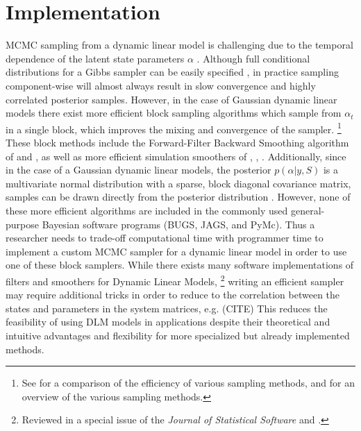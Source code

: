 \documentclass{article}
\begin{document}
\section{Implementation}
\label{sec:implementation}

MCMC sampling from a dynamic linear model is challenging due to the temporal dependence of the latent state parameters $\alpha$ \parencite{ReisSalazarGamerman2006}.
Although full conditional distributions for a Gibbs sampler can be easily specified \parencite{CarlinGelfandSmith1992}, in practice sampling component-wise will almost always result in slow convergence and highly correlated posterior samples.
However, in the case of Gaussian dynamic linear models there exist more efficient block sampling algorithms which sample from $\alpha_{t}$ in a single block, which improves the mixing and convergence of the sampler.%
\footnote{See \textcite{ReisSalazarGamerman2006} for a comparison of the efficiency of various sampling methods, and \textcite{migon2005dynamic} for an overview of the various sampling methods.}
These block methods include the Forward-Filter Backward Smoothing algorithm of \textcite{CarterKohn1994} and \textcite{Fruehwirth-Schnatter1994}, as well as more efficient simulation smoothers of \textcite{DeJongShephard1995}, \textcite{DurbinKoopman2002}, \textcite{StricklandTurnerDenhamEtAl2009}.%
Additionally, since in the case of a Gaussian dynamic linear models, the posterior $p(\alpha | y, S)$ is a multivariate normal distribution with a sparse, block diagonal covariance matrix, samples can be drawn directly from the posterior distribution \parencites{migon2005dynamic}{ChanJeliazkov2009}.
However, none of these more efficient algorithms are included in the commonly used general-purpose Bayesian software programs (BUGS, JAGS, and PyMc).
Thus a researcher needs to trade-off computational time with programmer time to implement a custom MCMC sampler for a dynamic linear model in order to use one of these block samplers.
While there exists many software implementations of filters and smoothers for Dynamic Linear Models,%
\footnote{Reviewed in a special issue of the \textit{Journal of Statistical Software} \textcite{CommandeurKoopmanOoms2011} and \textcite{Tusell2011}.}
writing an efficient sampler may require additional tricks in order to reduce to the correlation between the states and parameters in the system matrices, e.g. (CITE)
This reduces the feasibility of using DLM models in applications despite their theoretical and intuitive advantages and flexibility for more specialized but already implemented methods.
\end{document}
